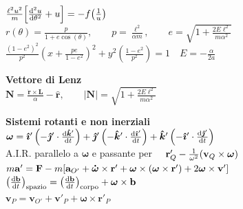 \documentclass[a4paper,7pt]{article}
\newcommand{\ihat}{\boldsymbol{\hat{\imath}}}
\newcommand{\jhat}{\boldsymbol{\hat{\jmath}}}
\newcommand{\khat}{\boldsymbol{\hat{k}}}
\begin{document}
\begin{minipage}{0.5\textwidth}
		$\frac{\ell^2u^2}{m}\qty[\dv[2]{u}{\theta}+u]=-f\qty(\frac{1}{u})$\\
		
		$r(\theta)=\frac{p}{1+e\cos(\theta)},\qquad p=\frac{\ell^2}{\alpha m},\qquad e=\sqrt{1+\frac{2E\ell^2}{m \alpha^2}}$\\
		
		$\frac{\left(1-e^2\right)^2}{p^2}\left(x+\frac{pe}{1-e^2}\right)^2+y^2\left(\frac{1-e^2}{p^2}\right)=1\quad E=-\frac{\alpha}{2a}$
		\vspace{0.5 cm}
		
		\textbf{Vettore di Lenz}\\
				
		$\mathbf{N}=\frac{\mathbf{\dot{r}}\times \mathbf{L}}{\alpha}-\mathbf{\hat{r}},\qquad |\mathbf{N}|=\sqrt{1+\frac{2E\ell^2}{m\alpha^2}}$\\
		\vspace{0.5 cm}
		
		\textbf{Sistemi rotanti e non inerziali}\\
		
		$\boldsymbol{\omega}=\ihat'\left(-\jhat'\cdot\dv{\khat'}{t}\right)+\jhat'\left(-\khat'\cdot\dv{\ihat'}{t}\right)+\khat'\left(-\ihat'\cdot\dv{\jhat'}{t}\right)$\\
		
		A.I.R. parallelo a $\boldsymbol{\omega}$ e passante per $\quad \mathbf{r}'_Q-\frac{1}{\omega^2}\qty(\mathbf{v}_Q\times\boldsymbol{\omega})$\\
		
		$m\mathbf{a}'=\mathbf{F}-m\qty[\mathbf{a}_{O'}+\boldsymbol{\dot{\omega}}\times\mathbf{r}'+\boldsymbol{\omega}\times\qty(\boldsymbol{\omega}\times\mathbf{r}')+2\boldsymbol{\omega}\times\mathbf{v}']$\\
		
		$\qty(\dv{\mathbf{b}}{t})_{\text{spazio}}=\qty(\dv{\mathbf{b}}{t})_{\text{corpo}}+\boldsymbol{\omega}\times \mathbf{b}$\\
		
		$\mathbf{v}_P=\mathbf{v}_{O'}+\mathbf{v}'_P+\boldsymbol{\omega}\times \mathbf{r}'_{P}$
		
		\vspace{0.5 cm}
		
		
		
		
		
	\end{minipage}
	\hfill
\end{document}
